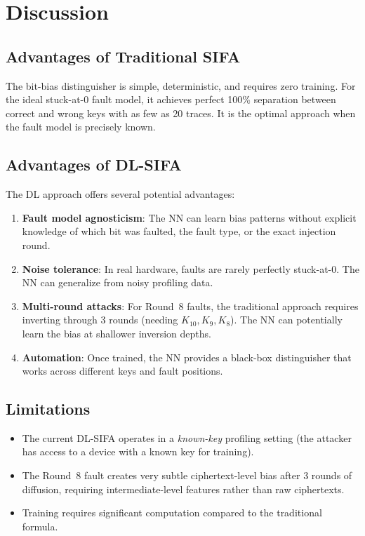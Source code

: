 \documentclass[11pt,a4paper]{article}
\begin{document}
\section{Discussion}

\subsection{Advantages of Traditional SIFA}

The bit-bias distinguisher is simple, deterministic, and requires zero training. For the ideal stuck-at-0 fault model, it achieves perfect 100\% separation between correct and wrong keys with as few as 20 traces. It is the optimal approach when the fault model is precisely known.

\subsection{Advantages of DL-SIFA}

The DL approach offers several potential advantages:

\begin{enumerate}
    \item \textbf{Fault model agnosticism}: The NN can learn bias patterns without explicit knowledge of which bit was faulted, the fault type, or the exact injection round.
    \item \textbf{Noise tolerance}: In real hardware, faults are rarely perfectly stuck-at-0. The NN can generalize from noisy profiling data.
    \item \textbf{Multi-round attacks}: For Round~8 faults, the traditional approach requires inverting through 3 rounds (needing $K_{10}, K_9, K_8$). The NN can potentially learn the bias at shallower inversion depths.
    \item \textbf{Automation}: Once trained, the NN provides a black-box distinguisher that works across different keys and fault positions.
\end{enumerate}

\subsection{Limitations}

\begin{itemize}
    \item The current DL-SIFA operates in a \emph{known-key} profiling setting (the attacker has access to a device with a known key for training).
    \item The Round~8 fault creates very subtle ciphertext-level bias after 3 rounds of diffusion, requiring intermediate-level features rather than raw ciphertexts.
    \item Training requires significant computation compared to the traditional formula.
\end{itemize}
\end{document}
